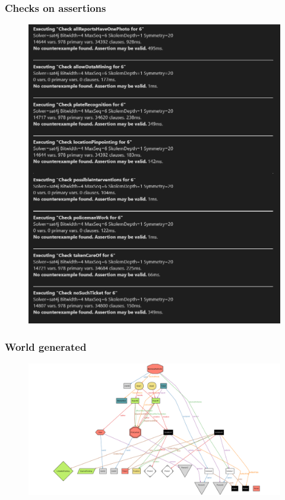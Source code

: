 \subsubsection{Checks on assertions}
\begin{figure}[h!]
	\includegraphics[scale=0.70]{Images/Assertions_result}
\end{figure}
\newpage
\subsubsection{World generated}
\begin{figure}[h!]
	\includegraphics[angle=90, scale=0.35]{Images/world}
\end{figure}